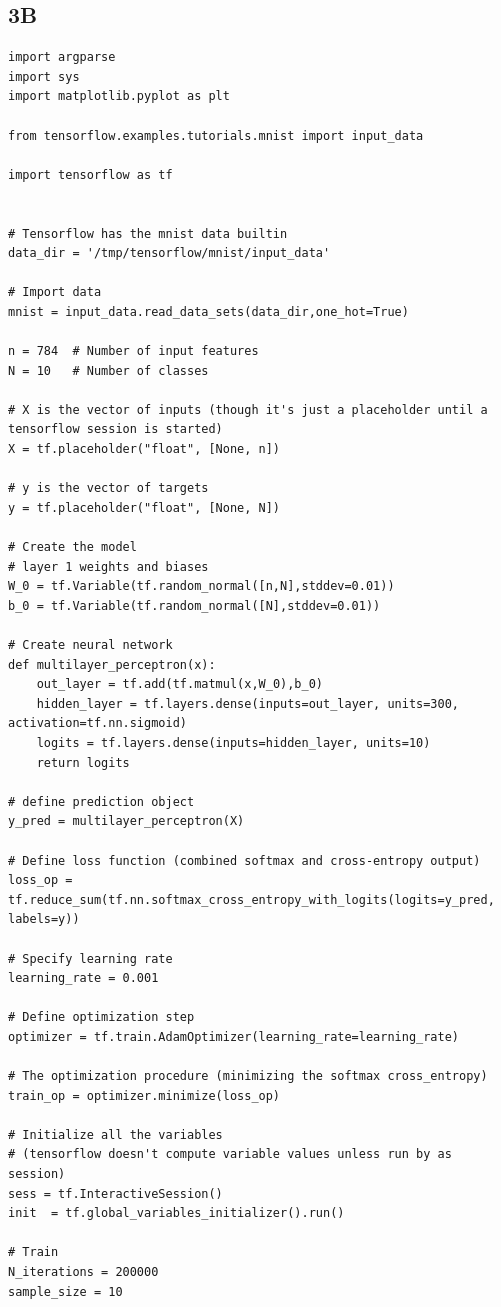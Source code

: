 \documentclass[12pt]{article}
\begin{document}
\begin{flushleft}
		\subsection*{3B}
		\begin{lstlisting}
import argparse
import sys
import matplotlib.pyplot as plt

from tensorflow.examples.tutorials.mnist import input_data

import tensorflow as tf


# Tensorflow has the mnist data builtin
data_dir = '/tmp/tensorflow/mnist/input_data'

# Import data
mnist = input_data.read_data_sets(data_dir,one_hot=True)

n = 784  # Number of input features
N = 10   # Number of classes

# X is the vector of inputs (though it's just a placeholder until a tensorflow session is started)
X = tf.placeholder("float", [None, n])

# y is the vector of targets
y = tf.placeholder("float", [None, N])

# Create the model
# layer 1 weights and biases
W_0 = tf.Variable(tf.random_normal([n,N],stddev=0.01))
b_0 = tf.Variable(tf.random_normal([N],stddev=0.01))

# Create neural network
def multilayer_perceptron(x):
	out_layer = tf.add(tf.matmul(x,W_0),b_0)
	hidden_layer = tf.layers.dense(inputs=out_layer, units=300, activation=tf.nn.sigmoid)
	logits = tf.layers.dense(inputs=hidden_layer, units=10)
	return logits

# define prediction object
y_pred = multilayer_perceptron(X)

# Define loss function (combined softmax and cross-entropy output) 
loss_op = tf.reduce_sum(tf.nn.softmax_cross_entropy_with_logits(logits=y_pred, labels=y))

# Specify learning rate
learning_rate = 0.001

# Define optimization step
optimizer = tf.train.AdamOptimizer(learning_rate=learning_rate)

# The optimization procedure (minimizing the softmax cross_entropy)
train_op = optimizer.minimize(loss_op)

# Initialize all the variables
# (tensorflow doesn't compute variable values unless run by as session)
sess = tf.InteractiveSession()
init  = tf.global_variables_initializer().run()

# Train
N_iterations = 200000
sample_size = 10


\end{lstlisting}
\end{flushleft}
\end{document}
